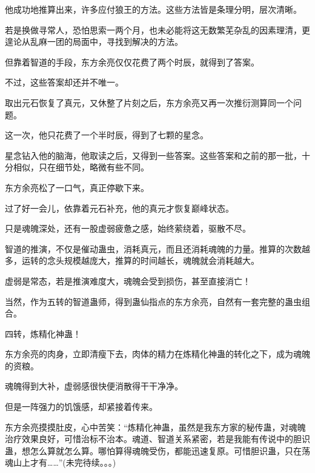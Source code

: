 \begin{this_body}
他成功地推算出来，许多应付狼王的方法。这些方法皆是条理分明，层次清晰。

若是换做寻常人，恐怕思索一两个月，也未必能将这无数繁芜杂乱的因素理清，更遑论从乱麻一团的局面中，寻找到解决的方法。

但靠着智道的手段，东方余亮仅仅花费了两个时辰，就得到了答案。

不过，这些答案却还并不唯一。

取出元石恢复了真元，又休整了片刻之后，东方余亮又再一次推衍测算同一个问题。

这一次，他只花费了一个半时辰，得到了七颗的星念。

星念钻入他的脑海，他取读之后，又得到一些答案。这些答案和之前的那一批，十分相似，只在细节处，略微有些不同。

东方余亮松了一口气，真正停歇下来。

过了好一会儿，依靠着元石补充，他的真元才恢复巅峰状态。

只是魂魄深处，还有一股虚弱疲惫之感，始终萦绕着，驱散不尽。

智道的推演，不仅是催动蛊虫，消耗真元，而且还消耗魂魄的力量。推算的次数越多，运转的念头规模越庞大，推算的时间越长，魂魄就会消耗越大。

虚弱是常态，若是推演难度大，魂魄会受到损伤，甚至直接消亡！

当然，作为五转的智道蛊师，得到蛊仙指点的东方余亮，自然有一套完整的蛊虫组合。

四转，炼精化神蛊！

东方余亮的肉身，立即清瘦下去，肉体的精力在炼精化神蛊的转化之下，成为魂魄的资粮。

魂魄得到大补，虚弱感很快便消散得干干净净。

但是一阵强力的饥饿感，却紧接着传来。

东方余亮摸摸肚皮，心中苦笑：“炼精化神蛊，虽然是我东方家的秘传蛊，对魂魄治疗效果良好，可惜治标不治本。魂道、智道关系紧密，若是我能有传说中的胆识蛊，想怎么算就怎么算。哪怕算得魂魄受伤，都能迅速复原。可惜胆识蛊，只在荡魂山上才有……”(未完待续。。。)

\end{this_body}

